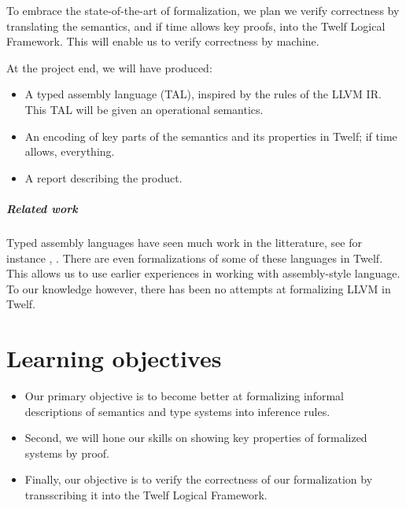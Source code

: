 \documentclass[a4paper, oneside, 10pt, draft]{memoir}
\begin{document}
To embrace the state-of-the-art of formalization, we plan we verify
correctness by translating the semantics, and if time allows key
proofs, into the Twelf Logical Framework. This will enable us to
verify correctness by machine.

At the project end, we will have produced:
\begin{itemize}
\item A typed assembly language (TAL), inspired by the rules of the LLVM
  IR. This TAL will be given an operational semantics.
\item An encoding of key parts of the semantics and its properties in
  Twelf; if time allows, everything.
\item A report describing the product.
\end{itemize}

\paragraph{Related work}

Typed assembly languages have seen much work in the litterature, see
for instance \cite{crary:2003:toward},
\cite{morrisett.crary.ea:1999:talx86}. There are even formalizations
of some of these languages in Twelf. This allows us to use earlier
experiences in working with assembly-style language. To our knowledge
however, there has been no attempts at formalizing LLVM in Twelf.

\chapter*{Learning objectives}

\begin{itemize}
\item Our primary objective is to become better at formalizing informal
  descriptions of semantics and type systems into inference rules.
\item Second, we will hone our skills on showing key properties of
  formalized systems by proof.
\item Finally, our objective is to verify the correctness of our
  formalization by transscribing it into the Twelf Logical Framework.
\end{itemize}


\end{document}
